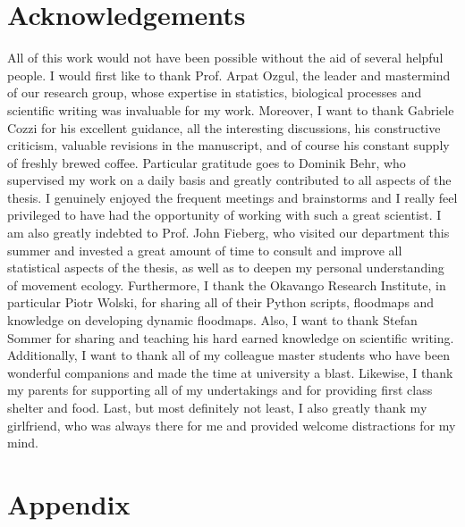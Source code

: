 \documentclass[abstract=on,10pt,a4paper,bibliography=totocnumbered]{scrartcl}
\begin{document}
\newpage
\section{Acknowledgements}
All of this work would not have been possible without the aid of several helpful
people. I would first like to thank Prof. Arpat Ozgul, the leader and mastermind
of our research group, whose expertise in statistics, biological processes and
scientific writing was invaluable for my work. Moreover, I want to thank
Gabriele Cozzi for his excellent guidance, all the interesting discussions, his
constructive criticism, valuable revisions in the manuscript, and of course his
constant supply of freshly brewed coffee. Particular gratitude goes to Dominik
Behr, who supervised my work on a daily basis and greatly contributed to all
aspects of the thesis. I genuinely enjoyed the frequent meetings and brainstorms
and I really feel privileged to have had the opportunity of working with such a
great scientist. I am also greatly indebted to Prof. John Fieberg, who visited
our department this summer and invested a great amount of time to consult and
improve all statistical aspects of the thesis, as well as to deepen my personal
understanding of movement ecology. Furthermore, I thank the Okavango Research
Institute, in particular Piotr Wolski, for sharing all of their Python scripts,
floodmaps and knowledge on developing dynamic floodmaps. Also, I want to thank
Stefan Sommer for sharing and teaching his hard earned knowledge on scientific
writing. Additionally, I want to thank all of my colleague master students who
have been wonderful companions and made the time at university a blast.
Likewise, I thank my parents for supporting all of my undertakings and for
providing first class shelter and food. Last, but most definitely not least, I
also greatly thank my girlfriend, who was always there for me and provided
welcome distractions for my mind.

\newpage
\begingroup
\singlespacing

\endgroup

\newpage
\appendix
\section{Appendix}
\end{document}
